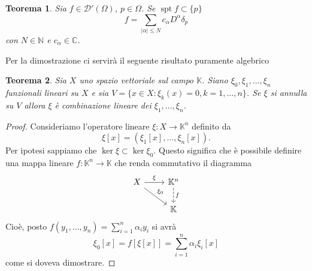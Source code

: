 \documentclass[italian,a4paper,oneside,headinclude]{scrbook}
\newcommand{\D}{\mathcal D}
\newcommand{\CC}{\mathbb C}
\newcommand{\KK}{\mathbb K}
\newcommand{\NN}{\mathbb N}
\newcommand{\abs}[1]{{\left|#1\right|}}
\DeclareMathOperator{\spt}{spt}
\newtheorem{theorem}{Teorema}
\begin{document}
\begin{theorem}\label{th:supp_punt}
  Sia $f\in \D'(\Omega)$, $p\in \Omega$. Se $\spt f\subset \{p\}$
  \[
  f = \sum_{\abs{\alpha}\le N} c_\alpha D^\alpha \delta_p
  \]
  con $N\in\NN$ e $c_\alpha\in\CC$.
\end{theorem}
%
Per la dimostrazione ci servirà il seguente risultato puramente
algebrico
\begin{theorem}
  Sia $X$ uno spazio vettoriale sul campo $\KK$. Siano
  $\xi_0, \xi_1,\dots,\xi_n$ funzionali lineari su $X$ e sia
  $V=\{x\in X\colon \xi_k(x)=0, k=1,\dots, n\}$. Se $\xi$ si annulla su
  $V$ allora $\xi$ è combinazione lineare dei $\xi_1,\dots,\xi_n$.
\end{theorem}
%
\begin{proof}
  Consideriamo l'operatore lineare $\xi\colon X\to \KK^n$ definito da
  \[
  \xi[x] = (\xi_1[x],\dots, \xi_n[x]).
  \]
  Per ipotesi sappiamo che $\ker \xi \subset \ker \xi_0$. Questo
  significa che è possibile definire una mappa lineare
  $f\colon \KK^n\to \KK$ che renda commutativo il diagramma
  \[
  \begin{tikzcd}
    X \arrow[rd, "\xi_0"] \arrow[r, "\xi"] & \KK^n \arrow[d, dashed, "f"]\\
    & \KK
  \end{tikzcd}
  \]
  Cioè, posto $f(y_1,\dots,y_n) = \sum_{i=1}^n \alpha_i y_i$ si avrà
  \[
  \xi_0[x] = f[\xi[x]] = \sum_{i=1}^n \alpha_i \xi_i[x]
  \]
  come si doveva dimostrare.
\end{proof}
\end{document}
